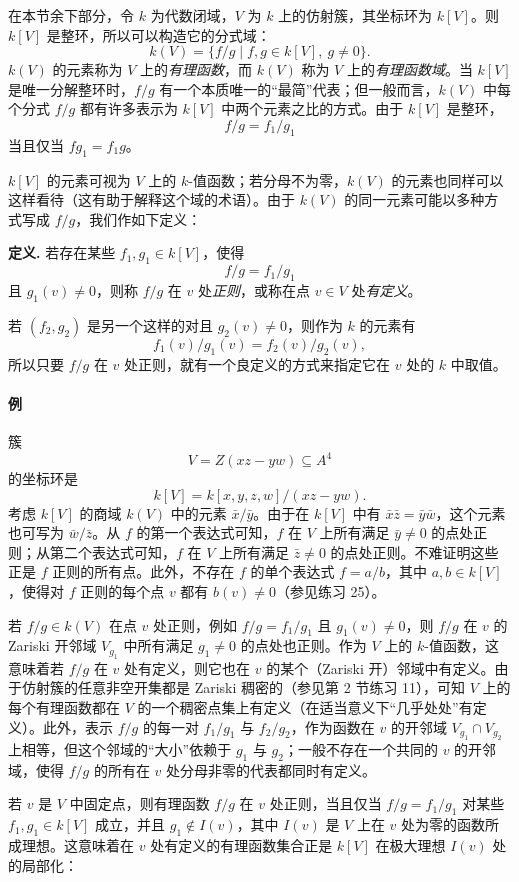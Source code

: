 在本节余下部分，令 $k$ 为代数闭域，$V$ 为 $k$ 上的仿射簇，其坐标环为 $k[V]$。则 $k[V]$ 是整环，所以可以构造它的分式域：
\[
k(V)=\{f/g\mid f,g\in k[V],\ g\ne0\}.
\]
$k(V)$ 的元素称为 $V$ 上的\emph{有理函数}，而 $k(V)$ 称为 $V$ 上的\emph{有理函数域}。当 $k[V]$ 是唯一分解整环时，$f/g$ 有一个本质唯一的“最简”代表；但一般而言，$k(V)$ 中每个分式 $f/g$ 都有许多表示为 $k[V]$ 中两个元素之比的方式。由于 $k[V]$ 是整环，
\[
f/g=f_1/g_1
\]
当且仅当 $fg_1=f_1g$。

$k[V]$ 的元素可视为 $V$ 上的 $k$-值函数；若分母不为零，$k(V)$ 的元素也同样可以这样看待（这有助于解释这个域的术语）。由于 $k(V)$ 的同一元素可能以多种方式写成 $f/g$，我们作如下定义：

\noindent\textbf{定义.} 若存在某些 $f_1,g_1\in k[V]$，使得
\[
f/g=f_1/g_1
\]
且 $g_1(v)\ne0$，则称 $f/g$ 在 $v$ 处\emph{正则}，或称在点 $v\in V$ 处\emph{有定义}。

若 $(f_2,g_2)$ 是另一个这样的对且 $g_2(v)\ne0$，则作为 $k$ 的元素有
\[
f_1(v)/g_1(v)=f_2(v)/g_2(v),
\]
所以只要 $f/g$ 在 $v$ 处正则，就有一个良定义的方式来指定它在 $v$ 处的 $k$ 中取值。

\paragraph{例}
簇
\[
V=Z(xz-yw)\subseteq A^4
\]
的坐标环是
\[
k[V]=k[x,y,z,w]/(xz-yw).
\]
考虑 $k[V]$ 的商域 $k(V)$ 中的元素 $\bar x/\bar y$。由于在 $k[V]$ 中有 $\bar x\bar z=\bar y\bar w$，这个元素也可写为 $\bar w/\bar z$。从 $f$ 的第一个表达式可知，$f$ 在 $V$ 上所有满足 $\bar y\ne0$ 的点处正则；从第二个表达式可知，$f$ 在 $V$ 上所有满足 $\bar z\ne0$ 的点处正则。不难证明这些正是 $f$ 正则的所有点。此外，不存在 $f$ 的单个表达式 $f=a/b$，其中 $a,b\in k[V]$，使得对 $f$ 正则的每个点 $v$ 都有 $b(v)\ne0$（参见练习 25）。

若 $f/g\in k(V)$ 在点 $v$ 处正则，例如 $f/g=f_1/g_1$ 且 $g_1(v)\ne0$，则 $f/g$ 在 $v$ 的 Zariski 开邻域 $V_{g_1}$ 中所有满足 $g_1\ne0$ 的点处也正则。作为 $V$ 上的 $k$-值函数，这意味着若 $f/g$ 在 $v$ 处有定义，则它也在 $v$ 的某个（Zariski 开）邻域中有定义。由于仿射簇的任意非空开集都是 Zariski 稠密的（参见第 2 节练习 11），可知 $V$ 上的每个有理函数都在 $V$ 的一个稠密点集上有定义（在适当意义下“几乎处处”有定义）。此外，表示 $f/g$ 的每一对 $f_1/g_1$ 与 $f_2/g_2$，作为函数在 $v$ 的开邻域 $V_{g_1}\cap V_{g_2}$ 上相等，但这个邻域的“大小”依赖于 $g_1$ 与 $g_2$；一般不存在一个共同的 $v$ 的开邻域，使得 $f/g$ 的所有在 $v$ 处分母非零的代表都同时有定义。

若 $v$ 是 $V$ 中固定点，则有理函数 $f/g$ 在 $v$ 处正则，当且仅当 $f/g=f_1/g_1$ 对某些 $f_1,g_1\in k[V]$ 成立，并且 $g_1\notin I(v)$，其中 $I(v)$ 是 $V$ 上在 $v$ 处为零的函数所成理想。这意味着在 $v$ 处有定义的有理函数集合正是 $k[V]$ 在极大理想 $I(v)$ 处的局部化：

